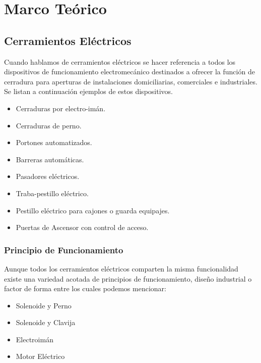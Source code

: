 
\chapter{Marco Teórico} %

\label{Chapter2} %


\section{Cerramientos Eléctricos}
Cuando hablamos de cerramientos eléctricos se hacer referencia a todos los dispositivos
de funcionamiento electromecánico destinados a ofrecer la función de cerradura para aperturas de instalaciones domiciliarias, comerciales e industriales.
Se listan a continuación ejemplos de estos dispositivos.
\begin{itemize}
	\item Cerraduras por electro-imán.
	\item Cerraduras de perno.
	\item Portones automatizados.
	\item Barreras automáticas.
	\item Pasadores eléctricos.
	\item Traba-pestillo eléctrico.
	\item Pestillo eléctrico para cajones o guarda equipajes.
	\item Puertas de Ascensor con control de acceso.
\end{itemize}


\subsection{Principio de Funcionamiento}
Aunque todos los cerramientos eléctricos comparten la misma funcionalidad existe una variedad acotada de principios de funcionamiento, diseño industrial o factor de forma entre los cuales podemos mencionar:
\begin{itemize}
	\item Solenoide y Perno
	\item Solenoide y Clavija
	\item Electroimán
	\item Motor Eléctrico
\end{itemize}

